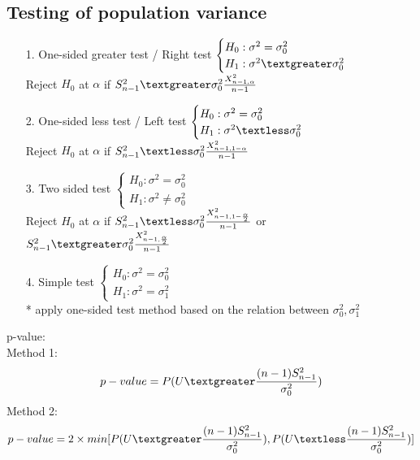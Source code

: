 \documentclass{article}
\begin{document}
\subsection{Testing of population variance}
\begin{itemize}
    \item[1.] One-sided greater test / Right test
    $\begin{cases}
        H_0 :\sigma^2=\sigma^2_0\\
        H_1: \sigma^2 \textgreater \sigma_0^2
    \end{cases}$\\
    Reject $H_0$ at $\alpha$ if $S_{n-1}^2 \textgreater \sigma_0^2 \frac{X_{n-1,\alpha}^2}{n-1}$
    \item[2.] One-sided less test / Left test
    $\begin{cases}
        H_0:\sigma^2 = \sigma^2_0\\
        H_1: \sigma^2 \textless \sigma_0^2
    \end{cases}$\\
    Reject $H_0$ at $\alpha$ if $S^2_{n-1} \textless \sigma^2_0 \frac{X^2_{n-1,1-\alpha}}{n-1}$
    \item[3.] Two sided test
    $\begin{cases}
        H_0: \sigma^2 = \sigma^2_0\\
        H_1: \sigma^2 \neq \sigma^2_0
    \end{cases}$\\
    Reject $H_0$ at $\alpha$ if $S^2_{n-1} \textless \sigma^2_0 \frac{X^2_{n-1,1-\frac{\alpha}{2}}}{n-1}$ or $S^2_{n-1}\textgreater \sigma^2_0 \frac{X^2_{n-1,\frac{\alpha}{2}}}{n-1}$
    \item[4.] Simple test
    $\begin{cases}
        H_0: \sigma^2 = \sigma^2_0\\
        H_1: \sigma^2 = \sigma^2_1
    \end{cases}$\\
    * apply one-sided test method based on the relation between $\sigma^2_0, \sigma^2_1$
\end{itemize}
p-value:\\
Method 1: \[p-value = P(U\textgreater \frac{(n-1)S^2_{n-1}}{\sigma^2_0})\]
Method 2: \[p-value=2\times min[P(U\textgreater\frac{(n-1)S^2_{n-1}}{\sigma^2_0}),P(U\textless\frac{(n-1)S^2_{n-1}}{\sigma^2_0})]\]
\end{document}
